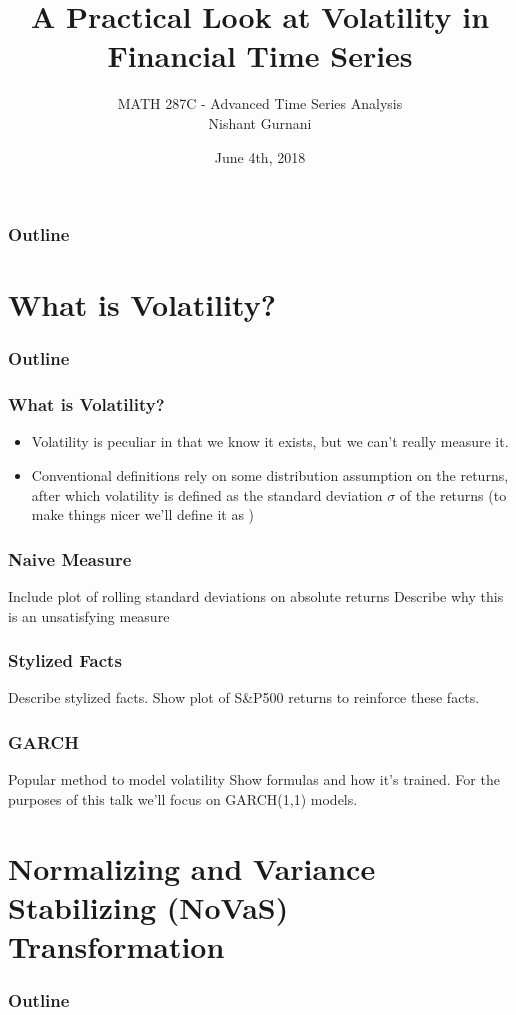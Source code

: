 \documentclass{beamer}
\title[]{A Practical Look at Volatility in Financial Time Series}
\author{MATH 287C - Advanced Time Series Analysis \\ Nishant Gurnani}
\date{June 4th, 2018}
\begin{document}
\begin{frame}
\titlepage
\end{frame}


\begin{frame}
\frametitle{Outline}
\tableofcontents[]
\end{frame}

\section{What is Volatility?}

\begin{frame}
\frametitle{Outline}
\tableofcontents[currentsection]
\end{frame}

\begin{frame}
\frametitle{What is Volatility?}
\begin{itemize}
\item Volatility is peculiar in that we know it exists, but we can't really measure it.
\item Conventional definitions rely on some distribution assumption on the returns, after which volatility is defined as the standard deviation $\sigma$ of the returns (to make things nicer we'll define it as )
\end{itemize}
\end{frame}

\begin{frame}
\frametitle{Naive Measure}
Include plot of rolling standard deviations on absolute returns
Describe why this is an unsatisfying measure
\end{frame}

\begin{frame}
\frametitle{Stylized Facts}
Describe stylized facts.
Show plot of S&P500 returns to reinforce these facts.
\end{frame}

\begin{frame}
\frametitle{GARCH}
Popular method to model volatility
Show formulas and how it's trained.
For the purposes of this talk we'll focus on GARCH(1,1) models.
\end{frame}

\section{Normalizing and Variance Stabilizing (NoVaS) Transformation}

\begin{frame}
\frametitle{Outline}
\tableofcontents[currentsection]
\end{frame}
\end{document}
